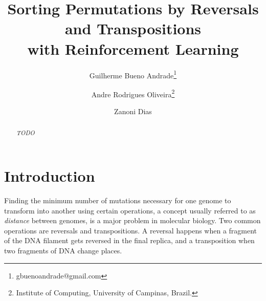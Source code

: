 \documentclass[11pt,twoside]{article}
\begin{document}


%



\TRMakeCover

\pagestyle{myheadings}

\title{Sorting Permutations by Reversals and Transpositions\\ with Reinforcement Learning}

\newcommand*\samethanks[1][\value{footnote}]{\footnotemark[#1]}
\author{Guilherme Bueno Andrade\thanks{gbuenoandrade@gmail.com} \and
Andre Rodrigues Oliveira\thanks{Institute of Computing, University of Campinas, Brazil.} \and Zanoni Dias\samethanks}

\date{}

\maketitle


\begin{abstract} 
\textit{TODO}
\end{abstract}

\section{Introduction}

Finding the minimum number of mutations necessary for one genome to transform into another using certain operations, a concept usually referred to as \textit{distance} between genomes, is a major problem in molecular biology. Two common operations are reversals and transpositions. A reversal happens when a fragment of the DNA filament gets reversed in the final replica, and a transposition when two fragments of DNA change places. 
\end{document}
